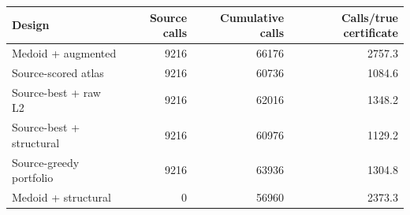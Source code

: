 \begin{tabular}{lrrr}
\toprule
Design & Source calls & Cumulative calls & Calls/true certificate \\
\midrule
Medoid + augmented & 9216 & 66176 & 2757.3 \\
Source-scored atlas & 9216 & 60736 & 1084.6 \\
Source-best + raw L2 & 9216 & 62016 & 1348.2 \\
Source-best + structural & 9216 & 60976 & 1129.2 \\
Source-greedy portfolio & 9216 & 63936 & 1304.8 \\
Medoid + structural & 0 & 56960 & 2373.3 \\
\bottomrule
\end{tabular}
